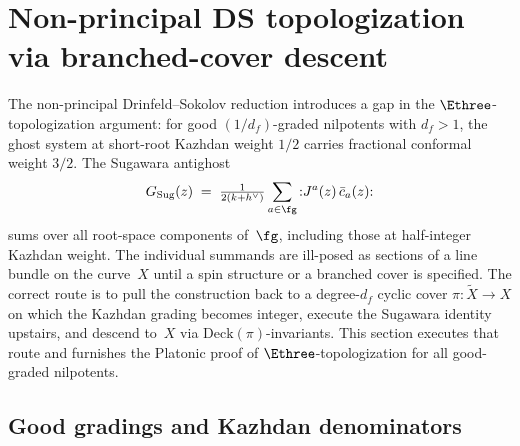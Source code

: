 %
%

\section{Non-principal DS topologization via branched-cover descent}
\label{sec:fm81-platonic}

The non-principal Drinfeld--Sokolov reduction introduces a gap in the
$\Ethree$-topologization argument: for good $(1/d_f)$-graded nilpotents
with $d_f > 1$, the ghost system at short-root Kazhdan weight $1/2$
carries fractional conformal weight $3/2$. The Sugawara antighost
\[
G_{\mathrm{Sug}}(z) \;=\; \tfrac{1}{2(k+h^{\vee})}
 \sum_{a \in \fg} {:}J^{a}(z)\,\bar c_{a}(z){:}
\]
sums over all root-space components of~$\fg$, including those at
half-integer Kazhdan weight. The individual summands are ill-posed as
sections of a line bundle on the curve~$X$ until a spin structure
or a branched cover is specified. The correct route is to pull the
construction back to a degree-$d_f$ cyclic cover
$\pi\colon \widetilde X \to X$ on which the Kazhdan grading becomes
integer, execute the Sugawara identity upstairs, and descend to~$X$
via $\mathrm{Deck}(\pi)$-invariants. This section executes that
route and furnishes the Platonic proof of
$\Ethree$-topologization for all good-graded nilpotents.

\subsection{Good gradings and Kazhdan denominators}
\label{subsec:good-grading-denominator}

